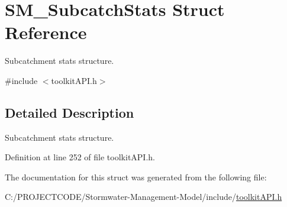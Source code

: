 \hypertarget{struct_s_m___subcatch_stats}{}\section{S\+M\+\_\+\+Subcatch\+Stats Struct Reference}
\label{struct_s_m___subcatch_stats}


Subcatchment stats structure.  




{\ttfamily \#include $<$toolkit\+A\+P\+I.\+h$>$}



\subsection{Detailed Description}
Subcatchment stats structure. 

Definition at line 252 of file toolkit\+A\+P\+I.\+h.



The documentation for this struct was generated from the following file\+:\begin{DoxyCompactItemize}
\item 
C\+:/\+P\+R\+O\+J\+E\+C\+T\+C\+O\+D\+E/\+Stormwater-\/\+Management-\/\+Model/include/\hyperlink{toolkit_a_p_i_8h}{toolkit\+A\+P\+I.\+h}\end{DoxyCompactItemize}
